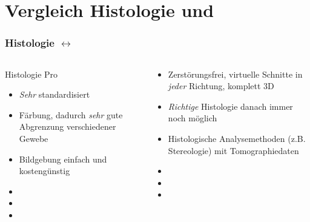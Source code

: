 \section{Vergleich Histologie und \uct}
\begin{frame}
 	\frametitle{Histologie \(\leftrightarrow\) \uct}
 	\begin{columns}%
		\begin{column}{0.49\linewidth}
			\centering
			Histologie Pro\only<2->{/\color{ubRed}{Contra}}
 				\begin{itemize}
 					\item \emph{Sehr} standardisiert
					\item Färbung, dadurch \emph{sehr} gute Abgrenzung verschiedener Gewebe
					\item Bildgebung einfach und kostengünstig
					\item<2-> \color{ubRed}{Limitiertes Sichtfeld}
					\item<2-> \color{ubRed}{Schnitte sind Schnitte}
 					\item<2-> \color{ubRed}{Zweidimensionale Bildgebung}
				\end{itemize}
		\end{column}%
 		\begin{column}{0.49\linewidth}%
 			\centering
 			\only<4>{/\color{ubRed}{Contra}}
			\begin{itemize}
				\item<3-> Zerstörungsfrei, virtuelle Schnitte in \emph{jeder} Richtung, komplett 3D
				\item<3-> \emph{Richtige} Histologie danach immer noch möglich
				\item<3-> Histologische Analysemethoden (z.B. Stereologie) mit Tomographie\-daten
				\item<4> 
				\item<4> \color{ubRed}{Kosten}
				\item<4> 
			\end{itemize}
		\end{column}
	\end{columns}
\end{frame}


